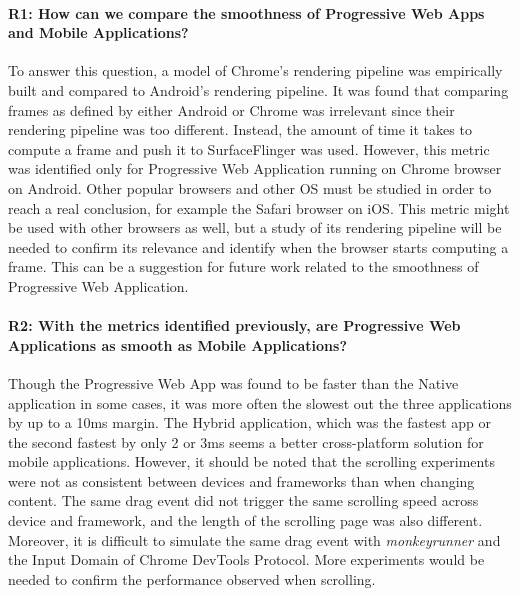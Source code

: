\paragraph{R1: How can we compare the smoothness of Progressive Web Apps and Mobile Applications?}
To answer this question, a model of Chrome's rendering pipeline was empirically built and compared to Android's rendering pipeline. It was found that comparing frames as defined by either Android or Chrome was irrelevant since their rendering pipeline was too different. Instead, the amount of time it takes to compute a frame and push it to SurfaceFlinger was used. \newline
However, this metric was identified only for Progressive Web Application running on Chrome browser on Android. Other popular browsers and other OS must be studied in order to reach a real conclusion, for example the Safari browser on iOS. This metric might be used with other browsers as well, but a study of its rendering pipeline will be needed to confirm its relevance and identify when the browser starts computing a frame. This can be a suggestion for future work related to the smoothness of Progressive Web Application. 

\paragraph{R2: With the metrics identified previously, are Progressive Web Applications as smooth as Mobile Applications?}
Though the Progressive Web App was found to be faster than the Native application in some cases, it was more often the slowest out the three applications by up to a 10ms margin. The Hybrid application, which was the fastest app or the second fastest by only 2 or 3ms seems a better cross-platform solution for mobile applications. \newline
However, it should be noted that the scrolling experiments were not as consistent between devices and frameworks than when changing content. The same drag event did not trigger the same scrolling speed across device and framework, and the length of the scrolling page was also different. Moreover, it is difficult to simulate the same drag event with \textit{monkeyrunner} and the Input Domain of Chrome DevTools Protocol. More experiments would be needed to confirm the performance observed when scrolling.

